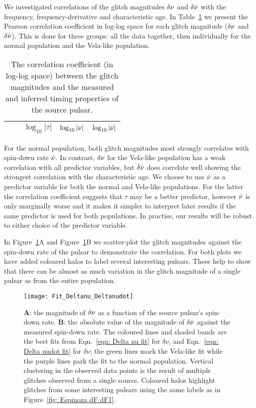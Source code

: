 \documentclass[../full_thesis/full_thesis.tex]{subfiles}
\newcommand{\thisdir}{../glitches_in_CGW}
\begin{document}
We investigated correlations of the
glitch magnitudes $\delta\nu$ and $\delta\dot{\nu}$ with the frequency,
frequency-derivative and characteristic age.
In Table~\ref{tab: correlation} we present the Pearson correlation coefficient
in log-log space for each glitch magnitude ($\delta\nu$ and $\delta\dot{\nu}$).
This is done for three groups:
all the data together, then individually for the normal population and the
Vela-like population.
\begin{table}[htb]
\begin{tabular}{l|l|ccc}
&  & $\log_{10}|\tau|$ & $\log_{10}|\nu|$ & $\log_{10}|\dot{\nu}|$ \\\hline

\end{tabular}
\caption{The correlation coefficient (in log-log space) between the glitch
magnitudes and the measured and inferred timing properties of the source pulsar.}
\label{tab: correlation}
\end{table}
For the normal population, both glitch magnitudes most strongly correlates with
spin-down rate $\dot{\nu}$. In contrast, $\delta\nu$ for the Vela-like population has
a weak correlation with all predictor variables, but $\delta\dot{\nu}$ does
correlate well showing the strongest correlation with the characteristic age.
We choose to use $\dot{\nu}$ as a predictor variable for both the normal and
Vela-like populations. For the latter the correlation coefficient suggests that
$\tau$ may be a better predictor, however $\dot{\nu}$ is only marginally
worse and it makes it simpler to interpret later results if the same predictor is
used for both populations. In practise, our results will be robust to either choice
of the predictor variable.

In Figure~\ref{fig: extrapolation fit}A  and Figure~\ref{fig: extrapolation fit}B
we scatter-plot
the glitch magnitudes against the spin-down rate of the pulsar to demonstrate the
correlation. For both plots we have added coloured
halos to label several interesting pulsars. These help to show that
there can be almost as much variation in the
glitch magnitude of a single pulsar as from the entire population.
\begin{figure}[htb]
\centering
\texttt{[image: Fit\_Deltanu\_Deltanudot]}
\caption{\textbf{A}: the magnitude of $\delta\nu$ as a function of the source
pulsar's spin-down rate. \textbf{B}: the absolute value of the magnitude of
$\delta\dot{\nu}$ against the measured spin-down rate. The coloured lines and shaded
bands are the best fits from Eqn.~\eqref{eqn: Delta nu fit} for $\delta\nu$,
and Eqn.~\eqref{eqn: Delta nudot fit} for $\delta \dot{\nu}$; the green lines
mark the Vela-like fit while the purple lines park the fit to the normal population.
Vertical clustering in the observed data points is the
result of multiple glitches observed from a single source. Coloured halos
highlight glitches from some interesting pulsars using the
same labels as in Figure~\ref{fig: Espinoza dF dF1}.}
\label{fig: extrapolation fit}
\end{figure}
\end{document}
